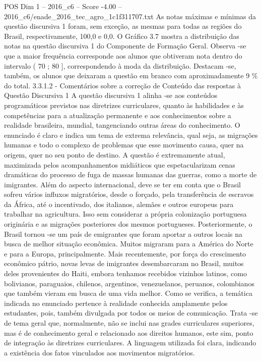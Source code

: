 \begin{textsample}{POS Dim 1 – 2016\_c6 – Score -4.00 – 2016\_c6/enade\_2016\_tec\_agro\_1c1f311707.txt}
As notas máximas e mínimas da questão discursiva 1 foram, sem exceção, as mesmas para todas as regiões do Brasil, respectivamente, 100,0 e 0,0.
O Gráfico 3.7 mostra a distribuição das notas na questão discursiva 1 do Componente de Formação Geral.
Observa -se que a maior frequência corresponde aos alunos que obtiveram nota dentro do intervalo ( 70 ; 80 ], correspondendo à moda da distribuição.
Destacam -se, também, os alunos que deixaram a questão em branco com aproximadamente 9 \% do total. 3.3.1.2 - Comentários sobre a correção de Conteúdo das respostas à Questão Discursiva 1 A questão discursiva 1 alinha -se aos conteúdos programáticos previstos nas diretrizes curriculares, quanto às habilidades e às competências para a atualização permanente e aos conhecimentos sobre a realidade brasileira, mundial, tangenciando outras áreas do conhecimento.
O enunciado é claro e indica um tema de extrema relevância, qual seja, as migrações humanas e todo o complexo de problemas que esse movimento causa, quer na origem, quer no seu ponto de destino.
A questão é extremamente atual, maximizada pelos acompanhamentos midiáticos que espetacularizam cenas dramáticas do processo de fuga de massas humanas das guerras, como a morte de imigrantes.
Além do aspecto internacional, deve se ter em conta que o Brasil sofreu vários influxos migratórios, desde o forçado, pela transferência de escravos da África, até o incentivado, dos italianos, alemães e outros europeus para trabalhar na agricultura.
Isso sem considerar a própria colonização portuguesa originária e as migrações posteriores dos mesmos portugueses.
Posteriormente, o Brasil tornou -se um país de emigrantes que foram aportar a outros locais na busca de melhor situação econômica.
Muitos migraram para a América do Norte e para a Europa, principalmente.
Mais recentemente, por força do crescimento econômico pátrio, novas levas de imigrantes desembarcaram no Brasil, muitos deles provenientes do Haiti, embora tenhamos recebidos vizinhos latinos, como bolivianos, paraguaios, chilenos, argentinos, venezuelanos, peruanos, colombianos que também vieram em busca de uma vida melhor.
Como se verifica, a temática indicada no enunciado pertence à realidade conhecida amplamente pelos estudantes, pois, também divulgada por todos os meios de comunicação.
Trata -se de tema geral que, normalmente, não se inclui nas grades curriculares superiores, mas é de conhecimento geral e relacionado aos direitos humanos, este sim, ponto de integração às diretrizes curriculares.
A linguagem utilizada foi clara, indicando a existência dos fatos vinculados aos movimentos migratórios.

\end{textsample}
